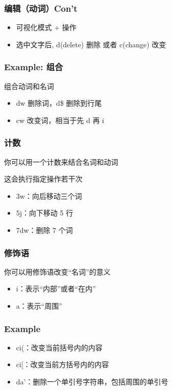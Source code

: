 \documentclass[UTF8, 16pt]{beamer}
\begin{document}
\begin{frame}
    \frametitle{编辑（动词）Con't}
    \begin{itemize}
        \item 可视化模式 + 操作
        \item 选中文字后, d(delete) 删除 或者 c(change) 改变
    \end{itemize}
\end{frame}

\begin{frame}
    \frametitle{Example: 组合}
    \textcolor{sufered}{组合动词和名词}
    \begin{itemize}
        \item dw 删除词，d\$ 删除到行尾
        \item cw 改变词，相当于先 d 再 i
    \end{itemize}
\end{frame}

\begin{frame}
    \frametitle{计数}
    \textcolor{sufered}{你可以用一个计数来结合名词和动词}

    这会执行指定操作若干次
    \begin{itemize}
        \item 3w：向后移动三个词
        \item 5j：向下移动 5 行
        \item 7dw：删除 7 个词
    \end{itemize}
\end{frame}

\begin{frame}
    \frametitle{修饰语}
    \textcolor{sufered}{你可以用修饰语改变“名词”的意义}
    \begin{itemize}
        \item i：表示“内部”或者“在内”
        \item a：表示“周围”
    \end{itemize}
\end{frame}

\begin{frame}
    \frametitle{Example}
    \begin{itemize}
        \item ci(：改变当前括号内的内容
        \item ci[：改变当前方括号内的内容
        \item da'：删除一个单引号字符串，包括周围的单引号
    \end{itemize}
\end{frame}
\end{document}

